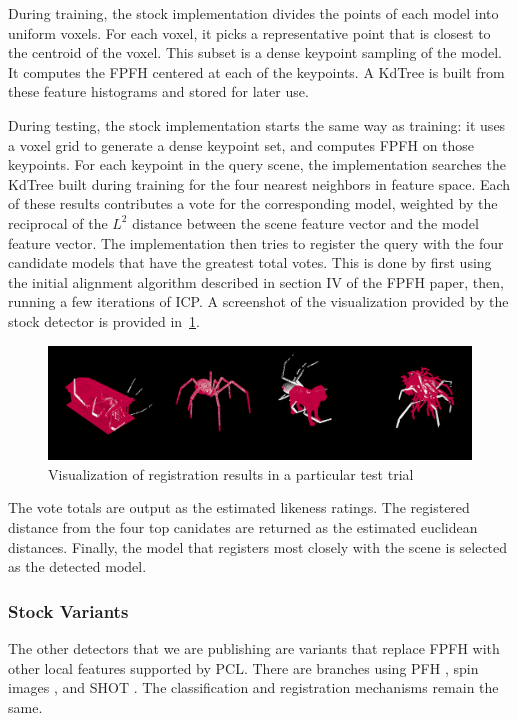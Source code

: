 During training, the stock implementation divides the points of each model into uniform voxels. For each voxel, it picks a representative point that is closest to the centroid of the voxel. This subset is a dense keypoint sampling of the model. It computes the FPFH centered at each of the keypoints. A KdTree is built from these feature histograms and stored for later use.

During testing, the stock implementation starts the same way as training: it uses a voxel grid to generate a dense keypoint set, and computes FPFH on those keypoints.
For each keypoint in the query scene, the implementation searches the KdTree built during training for the four nearest neighbors in feature space. Each of these results contributes a vote for the corresponding model, weighted by the reciprocal of the $L^2$ distance between the scene feature vector and the model feature vector.
The implementation then tries to register the query with the four candidate models that have the greatest total votes.
This is done by first using the initial alignment algorithm described in section IV of the FPFH paper, then, running a few iterations of ICP.
A screenshot of the visualization provided by the stock detector is provided in~\ref{fig:vis}.
\begin{figure}[thpb]
  \centering
  \includegraphics[width=\columnwidth]{../figures/visualization.png}
  \caption{Visualization of registration results in a particular test trial}
  \label{fig:vis}
\end{figure}

The vote totals are output as the estimated likeness ratings.
The registered distance from the four top canidates are returned as the estimated euclidean distances.
Finally, the model that registers most closely with the scene is selected as the detected model.

\subsubsection{Stock Variants}
The other detectors that we are publishing are variants that replace FPFH with other local features supported by PCL. There are branches using PFH \cite{pfh1, pfh2}, spin images \cite{SpinImages}, and SHOT \cite{shot}.
The classification and registration mechanisms remain the same.

